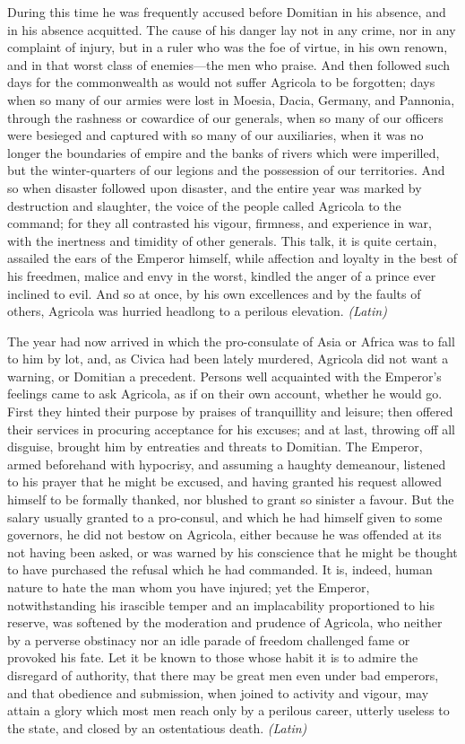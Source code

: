 During this time he was frequently accused before Domitian in his absence, and in his absence acquitted. The cause of his danger lay not in any crime, nor in any complaint of injury, but in a ruler who was the foe of virtue, in his own renown, and in that worst class of enemies—the men who praise. And then followed such days for the commonwealth as would not suffer Agricola to be forgotten; days when so many of our armies were lost in Moesia, Dacia, Germany, and Pannonia, through the rashness or cowardice of our generals, when so many of our officers were besieged and captured with so many of our auxiliaries, when it was no longer the boundaries of empire and the banks of rivers which were imperilled, but the winter-quarters of our legions and the possession of our territories. And so when disaster followed upon disaster, and the entire year was marked by destruction and slaughter, the voice of the people called Agricola to the command; for they all contrasted his vigour, firmness, and experience in war, with the inertness and timidity of other generals. This talk, it is quite certain, assailed the ears of the Emperor himself, while affection and loyalty in the best of his freedmen, malice and envy in the worst, kindled the anger of a prince ever inclined to evil. And so at once, by his own excellences and by the faults of others, Agricola was hurried headlong to a perilous elevation. \emph{(Latin)}


The year had now arrived in which the pro-consulate of Asia or Africa was to fall to him by lot, and, as Civica had been lately murdered, Agricola did not want a warning, or Domitian a precedent. Persons well acquainted with the Emperor's feelings came to ask Agricola, as if on their own account, whether he would go. First they hinted their purpose by praises of tranquillity and leisure; then offered their services in procuring acceptance for his excuses; and at last, throwing off all disguise, brought him by entreaties and threats to Domitian. The Emperor, armed beforehand with hypocrisy, and assuming a haughty demeanour, listened to his prayer that he might be excused, and having granted his request allowed himself to be formally thanked, nor blushed to grant so sinister a favour. But the salary usually granted to a pro-consul, and which he had himself given to some governors, he did not bestow on Agricola, either because he was offended at its not having been asked, or was warned by his conscience that he might be thought to have purchased the refusal which he had commanded. It is, indeed, human nature to hate the man whom you have injured; yet the Emperor, notwithstanding his irascible temper and an implacability proportioned to his reserve, was softened by the moderation and prudence of Agricola, who neither by a perverse obstinacy nor an idle parade of freedom challenged fame or provoked his fate. Let it be known to those whose habit it is to admire the disregard of authority, that there may be great men even under bad emperors, and that obedience and submission, when joined to activity and vigour, may attain a glory which most men reach only by a perilous career, utterly useless to the state, and closed by an ostentatious death. \emph{(Latin)}

